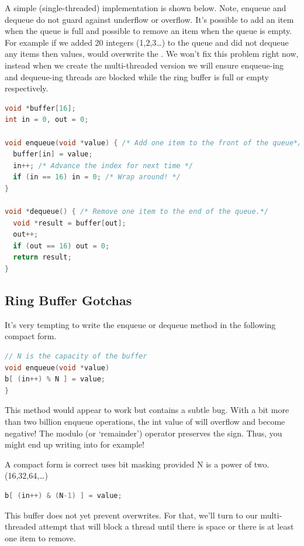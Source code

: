 A simple (single-threaded) implementation is shown below.
Note, enqueue and dequeue do not guard against underflow or overflow.
It's possible to add an item when the queue is full and possible to remove an item when the queue is empty.
For example if we added 20 integers (1,2,3\ldots{}) to the queue and did not dequeue any items then values,  would overwrite the .
We won't fix this problem right now, instead when we create the multi-threaded version we will ensure enqueue-ing and dequeue-ing threads are blocked while the ring buffer is full or empty respectively.

\begin{lstlisting}[language=C]
void *buffer[16];
int in = 0, out = 0;

void enqueue(void *value) { /* Add one item to the front of the queue*/
  buffer[in] = value;
  in++; /* Advance the index for next time */
  if (in == 16) in = 0; /* Wrap around! */
}

void *dequeue() { /* Remove one item to the end of the queue.*/
  void *result = buffer[out];
  out++;
  if (out == 16) out = 0;
  return result;
}
\end{lstlisting}

\subsection{Ring Buffer Gotchas}

It's very tempting to write the enqueue or dequeue method in the following compact form.

\begin{lstlisting}[language=C]
// N is the capacity of the buffer
void enqueue(void *value)
b[ (in++) % N ] = value;
}
\end{lstlisting}

This method would appear to work but contains a subtle bug.
With a bit more than two billion enqueue operations, the int value of  will overflow and become negative!
The modulo (or `remainder') operator \keyword{\%} preserves the sign.
Thus, you might end up writing into  for example!

A compact form is correct uses bit masking provided N is a power of two. (16,32,64,\ldots{})

\begin{lstlisting}[language=C]
b[ (in++) & (N-1) ] = value;
\end{lstlisting}

This buffer does not yet prevent overwrites.
For that, we'll turn to our multi-threaded attempt that will block a thread until there is space or there is at least one item to remove.

